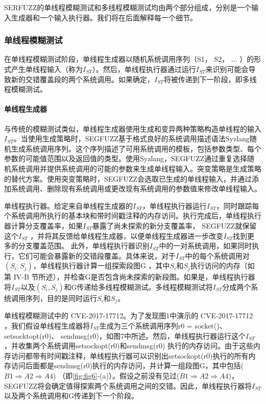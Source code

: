 SERFUZZ的单线程模糊测试和多线程模糊测试均由两个部分组成，分别是一个输入生成器和一个输入执行器。我们将在后面解释每一个细节。

\subsubsection{单线程模糊测试}

在单线程模糊测试阶段，单线程生成器以随机系统调用序列（S1， S2， ... ）的形式产生单线程输入（称为$I_{ST}$）。然后，单线程执行器通过运行$I_{ST}$来识别可能会导致新的交错覆盖段的两个系统调用。如果确定，$I_{ST}$将被传递到下一阶段，即多线程模糊测试。

\paragraph{单线程生成器}与传统的模糊测试类似，单线程生成器使用生成和变异两种策略构造单线程的输入$I_{ST}$。当使用生成策略时，SEGFUZZ基于格式良好的系统调用描述语法Syzlang随机生成系统调用序列。这个序列描述了可用系统调用的模板，包括参数类型、每个参数的可能值范围以及返回值的类型。使用Syzlang，SEGFUZZ通过重复选择随机系统调用并提供系统调用的可能的参数来生成单线程输入。突变策略是生成策略的替代方案。使用突变策略时，SEGFUZZ会选取已生成的单线程输入，并通过添加系统调用、删除现有系统调用或更改现有系统调用的参数值来修改单线程输入。

单线程执行器。给定来自单线程生成器的$I_{ST}$，单线程执行器运行$I_{ST}$，同时跟踪每个系统调用所执行的基本块和带时间戳注释的内存访问。执行完成后，单线程执行器计算分支覆盖率，如果$I_{ST}$暴露了尚未探索的新分支覆盖率， SEGFUZZ就保留这个$I_{ST}$ ，并将其反馈给单线程生成器，以便单线程生成器进一步改变$I_{ST}$找到更多的分支覆盖范围。
此外，单线程执行器识别$I_{ST}$中的一对系统调用，如果同时执行，它们可能会暴露新的交错段覆盖。具体来说，对于$I_{ST}$中的每个系统调用对$(S_i , S_j)$，单线程执行器计算一组探索段图G ，其中$S_i$和$S_j$执行访问的内存（如第 IV‑B 节所述），并检查G是否包含尚未探索的新段图。如果是，单线程执行器将$I_{ST}$以及$(S_i , S_j)$和G传递给多线程模糊测试。多线程模糊测试将$I_{ST}$分成两个系统调用序列，目的是同时运行$S_i$和$S_j$。

单线程模糊测试中的 CVE-2017-17712。为了发现图1中演示的 CVE-2017-17712 ，我们假设单线程生成器将$I_{ST}$生成为三个系统调用序列r0 = socket()、setsocktopt(r0)、 sendmsg(r0)，如图7中所述。然后，单线程执行器运行这个$I_{ST}$ ，并收集两个系统调用setsockopt(r0)和sendmsg(r0) 执行的内存访问。由于这些内存访问都带有时间戳注释，单线程执行器可以识别出setsockopt(r0)执行的所有内存访问后面都是sendmsg(r0)执行的内存访问，并计算一组段图G，其中包括($B1 \Rightarrow A2 \Rightarrow A4$) （即\autoref{fig:fig6}‑(a)）。假设之前没有见过($B1 \Rightarrow A2 \Rightarrow A4$)，SEGFUZZ将会确定值得探索两个系统调用之间的交错。因此，单线程执行器将$I_{ST}$以及两个系统调用和G传递到下一个阶段。

